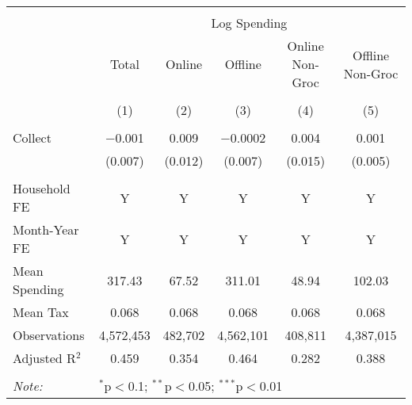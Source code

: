 
\begin{table}[!htbp] \centering 
  \caption{} 
  \label{} 
\begin{tabular}{@{\extracolsep{5pt}}lccccc} 
\\[-1.8ex]\hline 
\hline \\[-1.8ex] 
 & \multicolumn{5}{c}{Log Spending} \\ 
\cline{2-6} 
 & Total & Online & Offline & Online Non-Groc & Offline Non-Groc \\ 
\\[-1.8ex] & (1) & (2) & (3) & (4) & (5)\\ 
\hline \\[-1.8ex] 
 Collect & $-$0.001 & 0.009 & $-$0.0002 & 0.004 & 0.001 \\ 
  & (0.007) & (0.012) & (0.007) & (0.015) & (0.005) \\ 
 \hline \\[-1.8ex] 
Household FE & Y & Y & Y & Y & Y \\ 
Month-Year FE & Y & Y & Y & Y & Y \\ 
Mean Spending & 317.43 & 67.52 & 311.01 & 48.94 & 102.03 \\ 
Mean Tax & 0.068 & 0.068 & 0.068 & 0.068 & 0.068 \\ 
Observations & 4,572,453 & 482,702 & 4,562,101 & 408,811 & 4,387,015 \\ 
Adjusted R$^{2}$ & 0.459 & 0.354 & 0.464 & 0.282 & 0.388 \\ 
\hline 
\hline \\[-1.8ex] 
\textit{Note:}  & \multicolumn{5}{l}{$^{*}$p$<$0.1; $^{**}$p$<$0.05; $^{***}$p$<$0.01} \\ 
\end{tabular} 
\end{table} 
